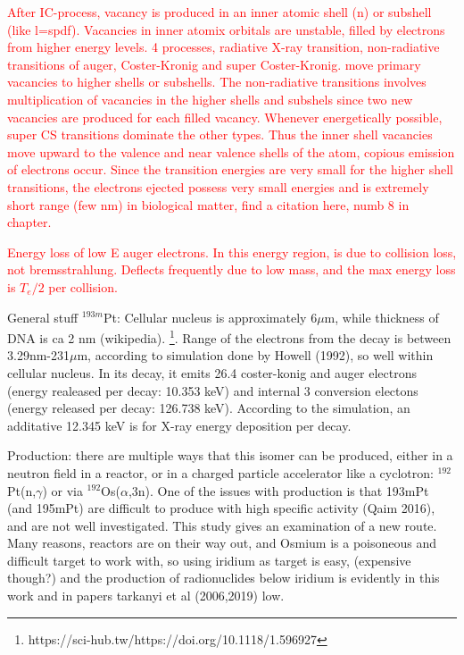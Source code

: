 \documentclass[a4paper,11pt,twoside]{book}
\begin{document}
\textcolor{red}{After IC-process, vacancy is produced in an inner atomic shell (n) or subshell (like l=spdf). Vacancies in inner atomix orbitals are unstable, filled by electrons from higher energy levels. 4 processes, radiative X-ray transition, non-radiative transitions of auger, Coster-Kronig and super Coster-Kronig. move primary vacancies to higher shells or subshells. The non-radiative transitions involves multiplication of vacancies in the higher shells and subshels since two new vacancies are produced for each filled vacancy. Whenever energetically possible, super CS transitions dominate the other types. Thus the inner shell vacancies move upward to the valence and near valence shells of the atom, copious emission of electrons occur. Since the transition energies are very small for the higher shell transitions, the electrons ejected possess very small energies and is extremely short range (few nm) in biological matter, find a citation here, numb 8 in chapter. }


\textcolor{red}{Energy loss of low E auger electrons. In this energy region, is due to collision loss, not bremsstrahlung. Deflects frequently due to low mass, and the max energy loss is $T_e/2$ per collision. }


General stuff $^{193m}$Pt: Cellular nucleus is approximately 6$\mu$m, while thickness of DNA is ca 2 nm (wikipedia). \footnote{https://sci-hub.tw/https://doi.org/10.1118/1.596927}. Range of the electrons from the decay is between 3.29nm-231$\mu$m, according to simulation done by Howell (1992), so well within cellular nucleus. In its decay, it emits 26.4 coster-konig and auger electrons (energy realeased per decay: 10.353 keV) and internal 3 conversion electons (energy released per decay: 126.738 keV). According to the simulation, an additative 12.345 keV is for X-ray energy deposition per decay. 

Production: there are multiple ways that this isomer can be produced, either in a neutron field in a reactor, or in a charged particle accelerator like a cyclotron: $^{192}$Pt(n,$\gamma$) or via $^{192}$Os($\alpha$,3n). One of the issues with production is that 193mPt (and 195mPt) are difficult to produce with high specific activity (Qaim 2016), and are not well investigated. This study gives an examination of a new route. Many reasons, reactors are on their way out, and Osmium is a poisoneous and difficult target to work with, so using iridium as target is easy, (expensive though?) and the production of radionuclides below iridium is evidently in this work and in papers tarkanyi et al (2006,2019) low. 
\end{document}
